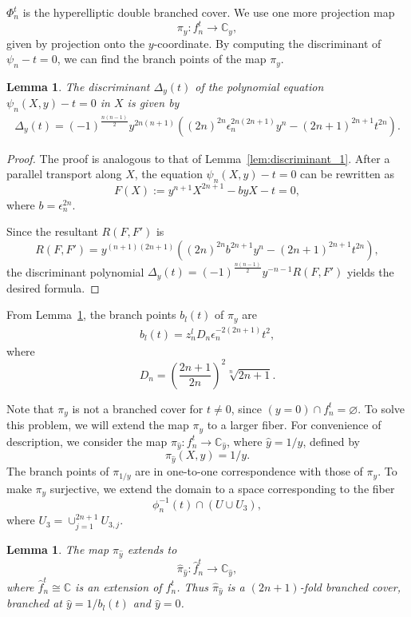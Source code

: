 \documentclass[10pt,a4paper,reqno]{amsart}
\newtheorem{lem}[thm]{Lemma}
\theoremstyle{definition}
\numberwithin{equation}{section}
\numberwithin{figure}{section}
\newcommand{\C}{\mathbb{C}}
\newcommand{\ep}{\epsilon}
\newcommand{\arrowr}{\rightarrow}
\begin{document}
$\Phi_n^t$ is the hyperelliptic double branched cover.
We use one more projection map \[\pi_y:f_n^t \arrowr \C_y,\]
given by projection onto the $y$-coordinate.
By computing the discriminant of $\psi_n-t=0$, we can find the branch points of the map $\pi_y$.

\begin{lem}\label{lem:discriminant_2}
The discriminant $\Delta_y(t)$ of the polynomial equation $\psi_n(X,y)-t=0$ in $X$ is given by
\begin{align}
\Delta_y(t)=(-1)^{\frac{n(n-1)}{2}} y^{2n(n+1)}((2n)^{2n}{\ep_n^{2n(2n+1)}}y^n-(2n+1)^{2n+1} t^{2n}).
\end{align}
\end{lem}

\begin{proof}
The proof is analogous to that of Lemma~\ref{lem:discriminant_1}.
After a parallel transport along $X$, the equation $\psi_n(X,y)-t=0$ can be rewritten as
\[F(X):=y^{n+1}X^{2n+1}-byX-t=0,\]
where $b={\ep_n^{2n}}$.

Since the resultant $R(F,F')$ is
\[R(F,F')=y^{(n+1)(2n+1)}((2n)^{2n}b^{2n+1} y^{n}-(2n+1)^{2n+1}t^{2n}),\]
the discriminant polynomial 
$\Delta_y(t)=(-1)^{\frac{n(n-1)}{2}}y^{-n-1}R(F,F')$
yields the desired formula.
\end{proof}

From Lemma~\ref{lem:discriminant_2}, the branch points $b_l(t)$ of $\pi_y$ are
\begin{align}
b_l(t)=z_n^l D_n {\ep_n^{-2(2n+1)}}t^2,
\end{align}
where \[D_n=\left(\frac{2n+1}{2n}\right)^2 \sqrt[n]{2n+1}.\]

Note that $\pi_y$ is not a branched cover for $t\neq 0$, since $(y=0)\cap f_n^t =\varnothing$.
To solve this problem, we will extend the map $\pi_y$ to a larger fiber.
For convenience of description, we consider the map $\pi_{\hat{y}}: f_n^t \arrowr \C_{\hat{y}}$, where $\hat{y}=1/y$, defined by
\[\pi_{\hat{y}}(X,y)=1/y.\]
The branch points of $\pi_{1/y}$ are in one-to-one correspondence with those of $\pi_y$.
To make $\pi_y$ surjective, we extend the domain to a space corresponding to the fiber \[\phi_n^{-1}(t) \cap (U \cup U_3),\]
where $U_3=\cup_{j=1}^{2n+1} U_{3,j}$.

\begin{lem}
The map $\pi_{\hat{y}}$ extends to 
\[\hat{\pi}_{\hat{y}}: \hat{f}_n^t \arrowr \C_{\hat{y}},\]
where $\hat{f}_n^t \cong \C$ is an extension of $f_n^t$. Thus $\hat{\pi}_{\hat{y}}$ is a $(2n+1)$-fold branched cover, branched at $\hat{y}=1/b_l(t)$ and $\hat{y}=0$.
\end{lem}
\end{document}
